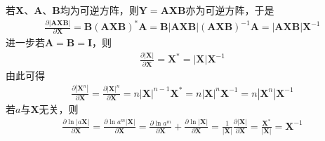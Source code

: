 \documentclass{ctexart}
\theoremstyle{definition}
\def \Av {\mathbf{A}}
\def \Bv {\mathbf{B}}
\def \Iv {\mathbf{I}}
\def \Xv {\mathbf{X}}
\def \Yv {\mathbf{Y}}
\begin{document}
若$\Xv$、$\Av$、$\Bv$均为可逆方阵，则$\Yv = \Av \Xv \Bv$亦为可逆方阵，于是
\begin{align} \label{eq: determinant}
    \frac{\partial |\Av \Xv \Bv|}{\partial \Xv} = \Bv (\Av \Xv \Bv)^* \Av = \Bv |\Av \Xv \Bv| (\Av \Xv \Bv)^{-1} \Av = |\Av \Xv \Bv| \Xv^{-1}
\end{align}
进一步若$\Av = \Bv = \Iv$，则
\begin{align*}
    \frac{\partial |\Xv|}{\partial \Xv} = \Xv^* = |\Xv| \Xv^{-1}
\end{align*}
由此可得
\begin{align*}
    \frac{\partial |\Xv^n|}{\partial \Xv} = \frac{\partial |\Xv|^n}{\partial \Xv} = n |\Xv|^{n-1} \Xv^* = n |\Xv|^n \Xv^{-1} = n |\Xv^n| \Xv^{-1}
\end{align*}
若$a$与$\Xv$无关，则
\begin{align*}
    \frac{\partial \ln |a \Xv|}{\partial \Xv} = \frac{\partial \ln a^m |\Xv|}{\partial \Xv} = \frac{\partial \ln a^m}{\partial \Xv} + \frac{\partial \ln |\Xv|}{\partial \Xv} = \frac{1}{|\Xv|} \frac{\partial |\Xv|}{\partial \Xv} = \frac{\Xv^*}{|\Xv|} = \Xv^{-1}
\end{align*}
\end{document}
